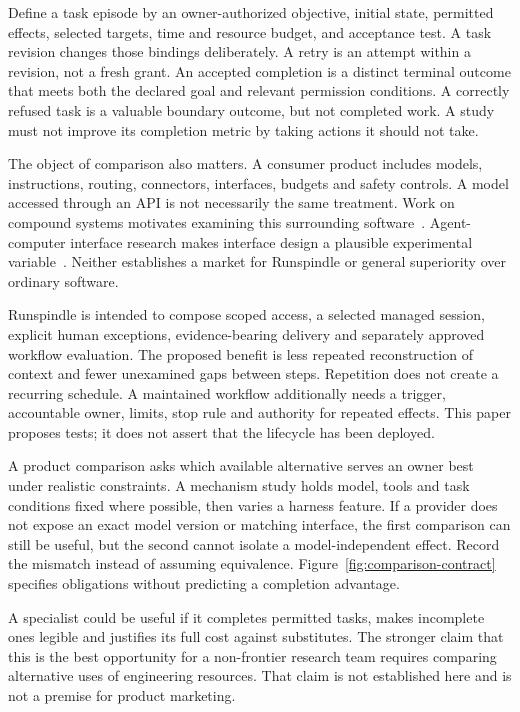 \documentclass[11pt,letterpaper]{article}
\begin{document}
Define a task episode by an owner-authorized objective, initial state, permitted
effects, selected targets, time and resource budget, and acceptance test. A task
revision changes those bindings deliberately. A retry is an attempt within a
revision, not a fresh grant. An accepted completion is a distinct terminal outcome
that meets both the declared goal and relevant permission conditions. A correctly
refused task is a valuable boundary outcome, but not completed work. A study must
not improve its completion metric by taking actions it should not take.

The object of comparison also matters. A consumer product includes models,
instructions, routing, connectors, interfaces, budgets and safety controls. A
model accessed through an API is not necessarily the same treatment. Work on
compound systems motivates examining this surrounding software~\cite{compound}.
Agent-computer interface research makes interface design a plausible experimental
variable~\cite{sweagent}. Neither establishes a market for Runspindle or general
superiority over ordinary software.

Runspindle is intended to compose scoped access, a selected managed session,
explicit human exceptions, evidence-bearing delivery and separately approved
workflow evaluation. The proposed benefit is less repeated reconstruction of
context and fewer unexamined gaps between steps. Repetition does not create a
recurring schedule. A maintained workflow additionally needs a trigger, accountable
owner, limits, stop rule and authority for repeated effects. This paper proposes
tests; it does not assert that the lifecycle has been deployed.



A product comparison asks which available alternative serves an owner best under
realistic constraints. A mechanism study holds model, tools and task conditions
fixed where possible, then varies a harness feature. If a provider does not expose
an exact model version or matching interface, the first comparison can still be
useful, but the second cannot isolate a model-independent effect. Record the
mismatch instead of assuming equivalence. Figure~\ref{fig:comparison-contract}
specifies obligations without predicting a completion advantage.

A specialist could be useful if it completes permitted tasks, makes incomplete
ones legible and justifies its full cost against substitutes. The stronger claim
that this is the best opportunity for a non-frontier research team requires
comparing alternative uses of engineering resources. That claim is not established
here and is not a premise for product marketing.
\end{document}
